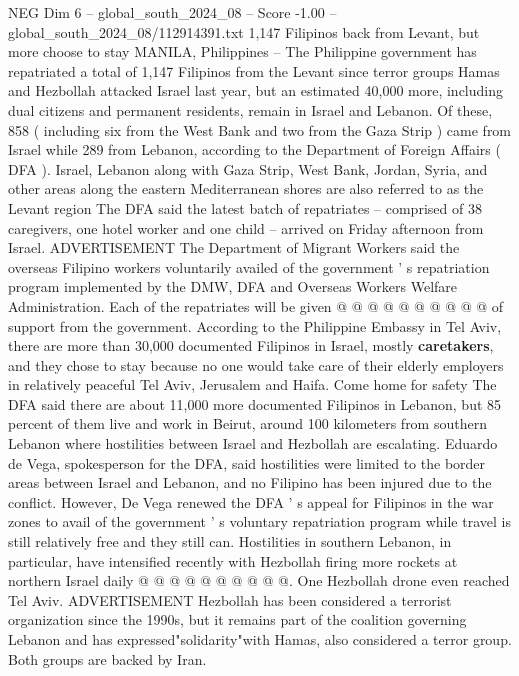 \begin{textsample}{NEG Dim 6 – global\_south\_2024\_08 – Score -1.00 – global\_south\_2024\_08/112914391.txt}  \label{ex:f6_neg_059}
1,147 Filipinos back from Levant, but more choose to stay MANILA, Philippines -- The Philippine government has repatriated a total of 1,147 Filipinos from the Levant since terror groups Hamas and Hezbollah attacked Israel last year, but an estimated 40,000 more, including dual citizens and permanent residents, remain in Israel and Lebanon.
Of these, 858 ( including six from the West Bank and two from the Gaza Strip ) came from Israel while 289 from Lebanon, according to the Department of Foreign Affairs ( DFA ).
Israel, Lebanon along with Gaza Strip, West Bank, Jordan, Syria, and other areas along the eastern Mediterranean shores are also referred to as the Levant region The DFA said the latest batch of repatriates -- comprised of 38 caregivers, one hotel worker and one child -- arrived on Friday afternoon from Israel.
ADVERTISEMENT The Department of Migrant Workers said the overseas Filipino workers voluntarily availed of the government ' s repatriation program implemented by the DMW, DFA and Overseas Workers Welfare Administration.
Each of the repatriates will be given @ @ @ @ @ @ @ @ @ @ of support from the government.
According to the Philippine Embassy in Tel Aviv, there are more than 30,000 documented Filipinos in Israel, mostly \textbf{caretakers}, and they chose to stay because no one would take care of their elderly employers in relatively peaceful Tel Aviv, Jerusalem and Haifa.
Come home for safety The DFA said there are about 11,000 more documented Filipinos in Lebanon, but 85 percent of them live and work in Beirut, around 100 kilometers from southern Lebanon where hostilities between Israel and Hezbollah are escalating.
Eduardo de Vega, spokesperson for the DFA, said hostilities were limited to the border areas between Israel and Lebanon, and no Filipino has been injured due to the conflict.
However, De Vega renewed the DFA ' s appeal for Filipinos in the war zones to avail of the government ' s voluntary repatriation program while travel is still relatively free and they still can.
Hostilities in southern Lebanon, in particular, have intensified recently with Hezbollah firing more rockets at northern Israel daily @ @ @ @ @ @ @ @ @ @.
One Hezbollah drone even reached Tel Aviv.
ADVERTISEMENT Hezbollah has been considered a terrorist organization since the 1990s, but it remains part of the coalition governing Lebanon and has expressed"solidarity"with Hamas, also considered a terror group.
Both groups are backed by Iran.

\end{textsample}

